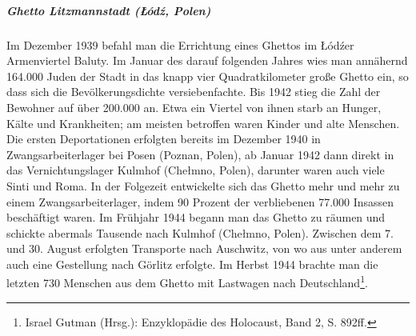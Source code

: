 \documentclass[a4paper,12pt,ngerman,
]{nisebook}
\begin{document}
\subparagraph{Ghetto Litzmannstadt (\L \'od\'z, Polen)}
Im Dezember 1939 befahl man die Errichtung eines Ghettos im \L \'od\'zer Armenviertel Baluty. Im Januar des darauf folgenden Jahres wies man annähernd 164.000 Juden der Stadt in das knapp vier Quadratkilometer große Ghetto ein, so dass sich die Bevölkerungsdichte versiebenfachte. Bis 1942 stieg die Zahl der Bewohner auf über 200.000 an. Etwa ein Viertel von ihnen starb an Hunger, Kälte und Krankheiten; am meisten betroffen waren Kinder und alte Menschen. Die ersten Deportationen erfolgten bereits im Dezember 1940 in Zwangsarbeiterlager bei Posen (Poznan, Polen), ab Januar 1942 dann direkt in das Vernichtungslager Kulmhof (Che\l mno, Polen), darunter waren auch viele Sinti und Roma. In der Folgezeit entwickelte sich das Ghetto mehr und mehr zu einem Zwangsarbeiterlager, indem 90 Prozent der verbliebenen 77.000 Insassen beschäftigt waren. Im Frühjahr 1944 begann man das Ghetto zu räumen und schickte abermals Tausende nach Kulmhof (Che\l mno, Polen). Zwischen dem 7. und 30. August erfolgten Transporte nach Auschwitz, von wo aus unter anderem auch eine Gestellung nach Görlitz erfolgte. Im Herbst 1944 brachte man die letzten 730 Menschen aus dem Ghetto mit Lastwagen nach Deutschland\footnote{Israel Gutman (Hrsg.): Enzyklopädie des Holocaust, Band 2, S. 892ff.}.
\end{document}
